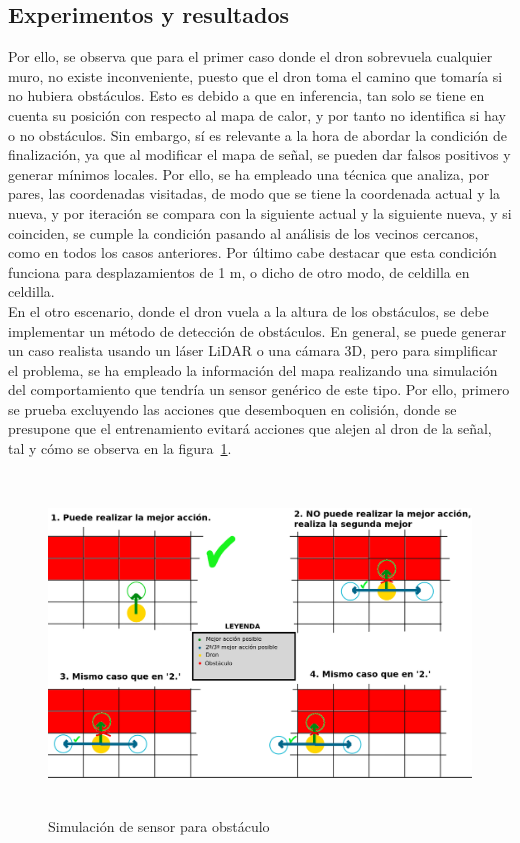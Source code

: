 \subsection{Experimentos y resultados}
\label{subsec:experimentos_sfo}

Por ello, se observa que para el primer caso donde el dron sobrevuela cualquier muro, no existe inconveniente, puesto que el dron toma el camino que tomaría si no hubiera obstáculos. Esto es debido a que en inferencia, tan solo se tiene en cuenta su posición con respecto al mapa de calor, y por tanto no identifica si hay o no obstáculos. Sin embargo, sí es relevante a la hora de abordar la condición de finalización, ya que al modificar el mapa de señal, se pueden dar falsos positivos y generar mínimos locales. Por ello, se ha empleado una técnica que analiza, por pares, las coordenadas visitadas, de modo que se tiene la coordenada actual y la nueva, y por iteración se compara con la siguiente actual y la siguiente nueva, y si coinciden, se cumple la condición pasando al análisis de los vecinos cercanos, como en todos los casos anteriores. Por último cabe destacar que esta condición funciona para desplazamientos de 1 m, o dicho de otro modo, de celdilla en celdilla.\\

En el otro escenario, donde el dron vuela a la altura de los obstáculos, se debe implementar un método de detección de obstáculos. En general, se puede generar un caso realista usando un láser LiDAR o una cámara 3D, pero para simplificar el problema, se ha empleado la información del mapa realizando una simulación del comportamiento que tendría un sensor genérico de este tipo. Por ello, primero se prueba excluyendo las acciones que desemboquen en colisión, donde se presupone que el entrenamiento evitará acciones que alejen al dron de la señal, tal y cómo se observa en la figura~\ref{fig:pseudosensor}.\\

\begin{figure} [tp]
    \begin{center}
    \includegraphics[height=9cm]{imagenes/cap4/28_pseudosensor.png}
    \end{center}
    \caption[Simulación de sensor para obstáculo]{Simulación de sensor para obstáculo}
    \label{fig:pseudosensor}
\end{figure}

